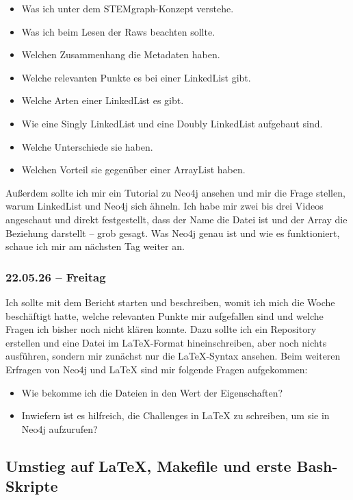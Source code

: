 \begin{itemize}
    \item Was ich unter dem STEMgraph-Konzept verstehe.
    \item Was ich beim Lesen der Raws beachten sollte.
    \item Welchen Zusammenhang die Metadaten haben.
    \item Welche relevanten Punkte es bei einer LinkedList gibt.
    \item Welche Arten einer LinkedList es gibt.
    \item Wie eine Singly LinkedList und eine Doubly LinkedList aufgebaut sind.
    \item Welche Unterschiede sie haben.
    \item Welchen Vorteil sie gegenüber einer ArrayList haben.
\end{itemize}
Außerdem sollte ich mir ein Tutorial zu Neo4j ansehen und mir die Frage stellen, warum LinkedList und Neo4j sich ähneln.
Ich habe mir zwei bis drei Videos angeschaut und direkt festgestellt, dass der Name die Datei ist und der Array die Beziehung darstellt -- grob gesagt. Was Neo4j genau ist und wie es funktioniert, schaue ich mir am nächsten Tag weiter an.

\subsubsection{22.05.26 -- Freitag}

Ich sollte mit dem Bericht starten und beschreiben, womit ich mich die Woche beschäftigt hatte, welche relevanten Punkte mir aufgefallen sind und welche Fragen ich bisher noch nicht klären konnte.
Dazu sollte ich ein Repository erstellen und eine Datei im LaTeX-Format hineinschreiben, aber noch nichts ausführen, sondern mir zunächst nur die LaTeX-Syntax ansehen.
Beim weiteren Erfragen von Neo4j und LaTeX sind mir folgende Fragen aufgekommen:

\begin{itemize}
    \item Wie bekomme ich die Dateien in den Wert der Eigenschaften?
    \item Inwiefern ist es hilfreich, die Challenges in LaTeX zu schreiben, um sie in Neo4j aufzurufen?
\end{itemize}

\subsection{Umstieg auf LaTeX, Makefile und erste Bash-Skripte}
